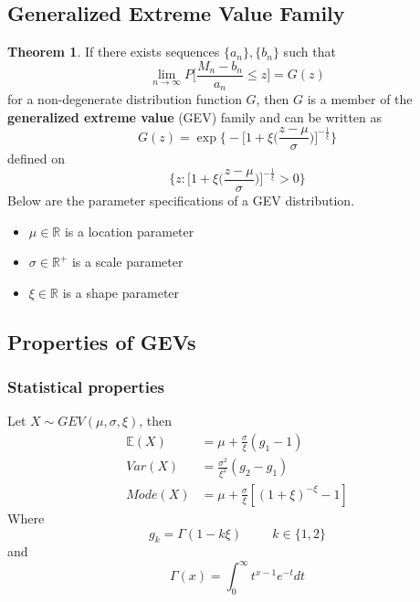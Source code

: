 \documentclass{article}
\theoremstyle{definition}
\newtheorem{theorem}{Theorem}
\theoremstyle{definition}
\def\E{\mathbb{E}}
\def\R{\mathbb{R}}
\begin{document}
\subsection{Generalized Extreme Value Family}
\begin{theorem}
If there exists sequences $\{a_n\},\{b_n\}$ such that 
\[\lim_{n\rightarrow\infty}P \bigg[\frac{M_n-b_n}{a_n}\leq z \bigg]=G(z)\tag{$\diamond$}\]
for a non-degenerate distribution function $G$, then $G$ is a member of the \textbf{generalized extreme value }(GEV) family and can be written as 
\[G(z)=\exp\bigg\{ - \bigg[1+\xi \bigg(\frac{z-\mu}{\sigma}\bigg)\bigg]^{-\frac{1}{\xi}}\bigg\}\]
defined on 
\[\{z:\bigg[1+\xi \bigg(\frac{z-\mu}{\sigma}\bigg)\bigg]^{-\frac{1}{\xi}}>0\}\]
Below are the parameter specifications of a GEV distribution.
\begin{itemize}
\item $\mu\in\R $ is a location parameter
\item $\sigma\in\R^+$ is a scale parameter
    \item $\xi\in \R$ is a shape parameter
\end{itemize}
\end{theorem}
\subsection{Properties of GEVs}
\subsubsection{Statistical properties}
Let $X\sim GEV(\mu, \sigma,\xi)$, then
\begin{align*}
    \E(X)&=\mu+\frac{\sigma}{\xi}(g_1-1)\\
    Var(X)&=\frac{\sigma^2}{\xi^2}(g_2-g_1)\\
    Mode(X)&=\mu+\frac{\sigma}{\xi}[(1+\xi)^{-\xi} -1]
\end{align*}
Where \[g_k=\Gamma(1-k\xi)\hspace{1cm} k\in\{1,2\}\]
and 
\[\Gamma(x)=\int_0^{\infty}t^{x-1}e^{-t}dt\]
\end{document}
